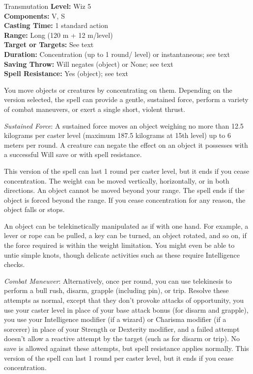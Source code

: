 {Transmutation}
{
	\textbf{Level:}
	Wiz 5\\
	\textbf{Components:}
	V, S\\
	\textbf{Casting Time:}
	1 standard action\\
	\textbf{Range:}
	Long (120 m + 12 m/level)\\
	\textbf{Target or Targets:}
	See text\\
	\textbf{Duration:}
	Concentration (up to 1 round/ level) or instantaneous; see text\\
	\textbf{Saving Throw:}
	Will negates (object) or None; see text\\
	\textbf{Spell Resistance:}
	Yes (object); see text\\
}
{
	You move objects or creatures by concentrating on them. Depending on the version selected, the spell can provide a gentle, sustained force, perform a variety of combat maneuvers, or exert a single short, violent thrust.

	\textit{Sustained Force}:
	A sustained force moves an object weighing no more than 12.5 kilograms per caster level (maximum 187.5 kilograms at 15th level) up to 6 meters per round. A creature can negate the effect on an object it possesses with a successful Will save or with spell resistance.

	This version of the spell can last 1 round per caster level, but it ends if you cease concentration. The weight can be moved vertically, horizontally, or in both directions. An object cannot be moved beyond your range. The spell ends if the object is forced beyond the range. If you cease concentration for any reason, the object falls or stops.

	An object can be telekinetically manipulated as if with one hand. For example, a lever or rope can be pulled, a key can be turned, an object rotated, and so on, if the force required is within the weight limitation. You might even be able to untie simple knots, though delicate activities such as these require Intelligence checks.

	\textit{Combat Maneuver}:
	Alternatively, once per round, you can use telekinesis to perform a bull rush, disarm, grapple (including pin), or trip. Resolve these attempts as normal, except that they don't provoke attacks of opportunity, you use your caster level in place of your base attack bonus (for disarm and grapple), you use your Intelligence modifier (if a wizard) or Charisma modifier (if a sorcerer) in place of your Strength or Dexterity modifier, and a failed attempt doesn't allow a reactive attempt by the target (such as for disarm or trip). No save is allowed against these attempts, but spell resistance applies normally. This version of the spell can last 1 round per caster level, but it ends if you cease concentration.

}
